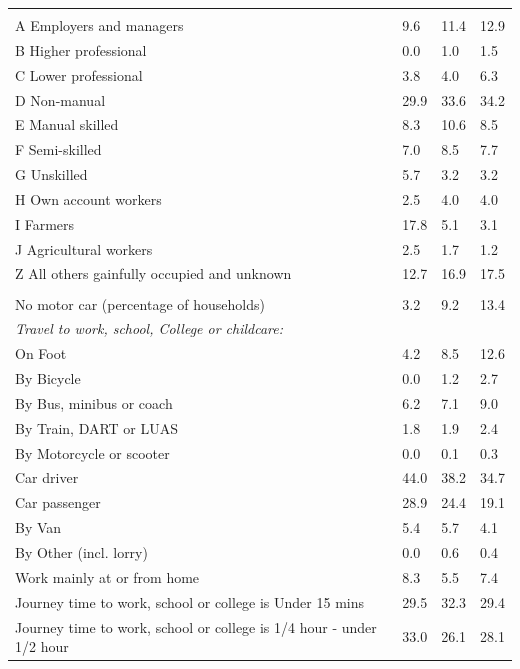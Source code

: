 \documentclass{article}
\begin{document}
\begin{table}[h]
\begin{tabular}{KTTT}
\hline
    \\ 
    \hline
A Employers and managers &  9.6& 11.4& 12.9\\
B Higher professional & 0.0& 1.0& 1.5\\
C Lower professional & 3.8& 4.0& 6.3\\
D Non-manual & 29.9& 33.6& 34.2\\
E Manual skilled &  8.3& 10.6&  8.5\\
F Semi-skilled & 7.0& 8.5& 7.7\\
G Unskilled & 5.7& 3.2& 3.2\\
H Own account workers & 2.5& 4.0& 4.0\\
I Farmers & 17.8&  5.1&  3.1\\
J Agricultural workers & 2.5& 1.7& 1.2\\
Z All others gainfully occupied and unknown & 12.7& 16.9& 17.5\\
\hline
{}\hline
    \\ 
    \hline
No motor car (percentage of households) &  3.2&  9.2& 
13.4\\
    \hline
\emph{Travel to work, school, College or childcare:} & & & \\
\quad On Foot &  4.2&  8.5& 12.6\\
\quad By Bicycle & 0.0& 1.2& 2.7\\
\quad By Bus, minibus or coach & 6.2& 7.1& 9.0\\
\quad By Train, DART or LUAS & 1.8& 1.9& 2.4\\
\quad By Motorcycle or scooter & 0.0& 0.1& 0.3\\
\quad Car driver & 44.0& 38.2& 34.7\\
\quad Car passenger & 28.9& 24.4& 19.1\\
\quad By Van & 5.4& 5.7& 4.1\\
\quad By Other (incl. lorry) & 0.0& 0.6& 0.4\\
    \hline
Work mainly at or from home & 8.3& 5.5& 7.4\\
Journey time to work, school or college is Under 15 mins & 29.5& 32.3& 29.4\\
Journey time to work, school or college is 1/4 hour - under 1/2 hour & 33.0& 26.1& 28.1\\

\end{tabular}
\end{table}
\end{document}
